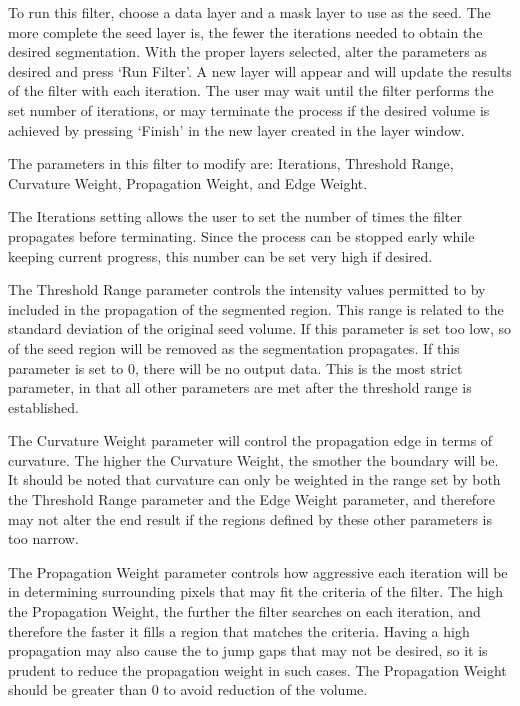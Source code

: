 \documentclass[fleqn,11pt,openany]{book}
\begin{document}
To run this filter, choose a data layer and a mask layer to use as the seed.  The more complete the seed layer is, the fewer the iterations needed to obtain the desired segmentation.  With the proper layers selected, alter the parameters as desired and press `Run Filter'.  A new layer will appear and will update the results of the filter with each iteration.  The user may wait until the filter performs the set number of iterations, or may terminate the process if the desired volume is achieved by pressing `Finish' in the new layer created in the layer window.  

The parameters in this filter to modify are: Iterations, Threshold Range, Curvature Weight, Propagation Weight, and Edge Weight.

The Iterations setting allows the user to set the number of times the filter propagates before terminating.  Since the process can be stopped early while keeping current progress, this number can be set very high if desired.

The Threshold Range parameter controls the intensity values permitted to by included in the propagation of the segmented region.  This range is related to the standard deviation of the original seed volume.  If this parameter is set too low, so of the seed region will be removed as the segmentation propagates.  If this parameter is set to 0, there will be no output data.  This is the most strict parameter, in that all other parameters are met after the threshold range is established.  

The Curvature Weight parameter will control the propagation edge in terms of curvature.  The higher the Curvature Weight, the smother the boundary will be.  It should be noted that curvature can only be weighted in the range set by both the Threshold Range parameter and the Edge Weight parameter, and therefore may not alter the end result if the regions defined by these other parameters is too narrow.  

The Propagation Weight parameter controls how aggressive each iteration will be in determining surrounding pixels that may fit the criteria of the filter.  The high the Propagation Weight, the further the filter searches on each iteration, and therefore the faster it fills a region that matches the criteria. Having a high propagation may also cause the to jump gaps that may not be desired, so it is prudent to reduce the propagation weight in such cases.  The Propagation Weight should be greater than 0 to avoid reduction of the volume.  
\end{document}
